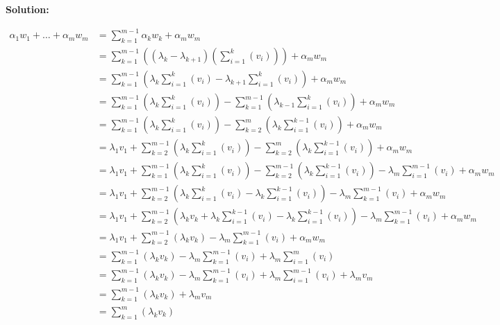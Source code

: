 \documentclass[10pt]{article}
\newenvironment{solution}{
	\vspace{1em}\par\large\textbf{{Solution:}}\par\vspace{1em}
}{
	\vspace{1em}
	\newpage
}
\begin{document}
\begin{solution}
	\begin{align*}
		\alpha_{1}w_1 + \ldots + \alpha_{m}w_m &= \sum_{k = 1}^{m - 1}\alpha_{k}w_k + \alpha_{m}w_m \\
		&= \sum_{k = 1}^{m - 1}\left((\lambda_k - \lambda_{k + 1})\left(\sum_{i = 1}^{k}(v_i) \right) \right) + \alpha_{m}w_m \\
		&= \sum_{k = 1}^{m - 1}\left( \lambda_k \sum_{i = 1}^{k}(v_i) - \lambda_{k + 1}\sum_{i = 1}^{k}(v_i) \right) + \alpha_{m}w_m \\
		&= \sum_{k = 1}^{m - 1}\left( \lambda_k \sum_{i = 1}^{k}(v_i) \right) - \sum_{k = 1}^{m - 1} \left( \lambda_{k - 1} \sum_{i = 1}^{k}(v_i) \right) + \alpha_{m}w_m \\
		&= \sum_{k = 1}^{m - 1}\left( \lambda_k \sum_{i = 1}^{k}(v_i) \right) - \sum_{k = 2}^{m} \left( \lambda_{k} \sum_{i = 1}^{k - 1}(v_i) \right) + \alpha_{m}w_m \\
		&= \lambda_{1}v_1 + \sum_{k = 2}^{m - 1} \left( \lambda_k \sum_{i = 1}^{k}(v_i) \right) - \sum_{k = 2}^{m} \left( \lambda_k \sum_{i = 1}^{k - 1}(v_i) \right) + \alpha_{m}w_m \\
		&= \lambda_{1}v_1 + \sum_{k = 1}^{m - 1} \left( \lambda_k \sum_{i = 1}^{k}(v_i) \right) - \sum_{k = 2}^{m - 1}\left(\lambda_{k}\sum_{i = 1}^{k - 1}(v_i) \right) - \lambda_{m}\sum_{i = 1}^{m - 1}(v_i) + \alpha_{m}w_m \\
		&= \lambda_{1}v_1 + \sum_{k = 2}^{m - 1} \left( \lambda_k \sum_{i = 1}^{k}(v_i) - \lambda_{k}\sum_{i = 1}^{k - 1}(v_i) \right) - \lambda_{m}\sum_{k = 1}^{m - 1}(v_i) + \alpha_{m}w_m \\
		&= \lambda_{1}v_1 + \sum_{k = 2}^{m - 1} \left( \lambda_{k}v_k + \lambda_{k}\sum_{i = 1}^{k - 1}(v_i) - \lambda_{k}\sum_{i = 1}^{k - 1}(v_i) \right) - \lambda_{m}\sum_{k = 1}^{m - 1}(v_i) + \alpha_{m}w_m \\
		&= \lambda_{1}v_1 + \sum_{k = 2}^{m - 1} \left( \lambda_{k}v_k \right) - \lambda_{m}\sum_{k = 1}^{m - 1}(v_i) + \alpha_{m}w_m \\
		&= \sum_{k = 1}^{m - 1} \left( \lambda_{k}v_k \right) - \lambda_{m}\sum_{k = 1}^{m - 1}(v_i) + \lambda_{m}\sum_{i = 1}^{m}(v_i) \\
		&= \sum_{k = 1}^{m - 1} \left( \lambda_{k}v_k \right) - \lambda_{m}\sum_{k = 1}^{m - 1}(v_i) + \lambda_{m}\sum_{i = 1}^{m - 1}(v_i) + \lambda_{m}v_m \\
		&= \sum_{k = 1}^{m - 1} \left( \lambda_{k}v_k \right) + \lambda_{m}v_m \\
		&= \sum_{k = 1}^{m} \left( \lambda_{k}v_k \right) \\
	\end{align*}


\end{solution}
\end{document}
